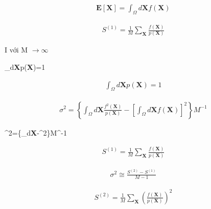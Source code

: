 \begin{align}
    \textbf{E}[\textbf{X}]=\int_{\Omega}{d\textbf{X}f(\textbf{X})}
\end{align}

\begin{align}
    S^{(1)}={\frac{1}{M}}{\sum_\textbf{X}{\frac{f(\textbf{X})}{p(\textbf{X})}}}
\end{align}

I với M $\rightarrow \infty$

\int_{\Omega}{d\textbf{X}p(\textbf{X})}=1

\begin{align}
    \int_{\Omega}{d\textbf{X}p(\textbf{X})}=1
\end{align}

\begin{align}
    \sigma^2=\left\{\int_{\Omega}d\textbf{X}\frac{f^2(\textbf{X})}{p(\textbf{X})}-\left[\int_{\Omega}d\textbf{X}f(\textbf{X})\right]^2\right\}M^{-1}
\end{align}

\sigma^2=\left\{\int_{\Omega}d\textbf{X}-^2\right\}M^{-1}


\begin{align}
    S^{(1)}={\frac{1}{M}}{\sum_\textbf{X}{\frac{f(\textbf{X})}{p(\textbf{X})}}}
\end{align}

\begin{align}
    \sigma^2\cong\frac{S^{(2)}-S^{(1)}}{M-1}
\end{align}


\begin{align}
    S^{(2)}=\frac{1}{M}{\sum_\textbf{X}}\left(\frac{f(\textbf{X})}{p(\textbf{X})}\right)^2
\end{align}

